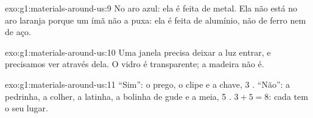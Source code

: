 \begin{solution}{exo:g1:materials-around-us:9}
No aro azul: ela é feita de metal. Ela não está no aro laranja porque
um ímã não a puxa: ela é feita de alumínio, não de ferro nem de aço.
\end{solution}

\begin{solution}{exo:g1:materials-around-us:10}
Uma janela precisa deixar a luz entrar, e precisamos ver através dela.
O vidro é transparente; a madeira não é.
\end{solution}

\begin{solution}{exo:g1:materials-around-us:11}
``Sim'': o prego, o clipe e a chave, 3 . ``Não'': a pedrinha, a
colher, a latinha, a bolinha de gude e a meia, 5 .
$3 + 5 = 8$: cada  tem o seu lugar.
\end{solution}
